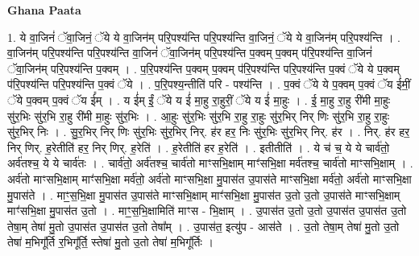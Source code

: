 \documentclass[17pt]{extarticle}
\begin{document}
\textbf{Ghana Paata } \newline

1. ये वा॒जिनं॑ ॅवा॒जिनं॒ ॅये ये वा॒जिन॑म् परि॒पश्य॑न्ति परि॒पश्य॑न्ति वा॒जिनं॒ ॅये ये वा॒जिन॑म् परि॒पश्य॑न्ति । . वा॒जिन॑म् परि॒पश्य॑न्ति परि॒पश्य॑न्ति वा॒जिनं॑ ॅवा॒जिन॑म् परि॒पश्य॑न्ति प॒क्वम् प॒क्वम् प॑रि॒पश्य॑न्ति वा॒जिनं॑ ॅवा॒जिन॑म् परि॒पश्य॑न्ति प॒क्वम् । . प॒रि॒पश्य॑न्ति प॒क्वम् प॒क्वम् प॑रि॒पश्य॑न्ति परि॒पश्य॑न्ति प॒क्वं ॅये ये प॒क्वम् प॑रि॒पश्य॑न्ति परि॒पश्य॑न्ति प॒क्वं ॅये । . प॒रि॒पश्य॒न्तीति॑ परि - पश्य॑न्ति । . प॒क्वं ॅये ये प॒क्वम् प॒क्वं ॅय ई॑मीं॒ ॅये प॒क्वम् प॒क्वं ॅय ई᳚म् । . य ई॑म् ईं॒ ॅये य ई॑ मा॒हु रा॒हुरीं॒ ॅये य ई॑ मा॒हुः । . ई॒ मा॒हु रा॒हु री॑मी मा॒हुः सु॑र॒भिः सु॑र॒भि रा॒हु री॑मी मा॒हुः सु॑र॒भिः । . आ॒हुः सु॑र॒भिः सु॑र॒भि रा॒हु रा॒हुः सु॑र॒भिर् निर् णिः सु॑र॒भि रा॒हु रा॒हुः सु॑र॒भिर् निः । . सु॒र॒भिर् निर् णिः सु॑र॒भिः सु॑र॒भिर् निर्. ह॑र हर॒ निः सु॑र॒भिः सु॑र॒भिर् निर्. ह॑र । . निर्. ह॑र हर॒ निर् णिर्. ह॒रेतीति॑ हर॒ निर् णिर्. ह॒रेति॑ । . ह॒रेतीति॑ हर ह॒रेति॑ । . इतीतीति॑ । . ये च॑ च॒ ये ये चार्व॑तो॒ अर्व॑तश्च॒ ये ये चार्व॑तः । . चार्व॑तो॒ अर्व॑तश्च॒ चार्व॑तो माꣳसभि॒क्षाम् माꣳ॑सभि॒क्षा मर्व॑तश्च॒ चार्व॑तो माꣳसभि॒क्षाम् । . अर्व॑तो माꣳसभि॒क्षाम् माꣳ॑सभि॒क्षा मर्व॑तो॒ अर्व॑तो माꣳसभि॒क्षा मु॒पास॑त उ॒पास॑ते माꣳसभि॒क्षा मर्व॑तो॒ अर्व॑तो माꣳसभि॒क्षा मु॒पास॑ते । . माꣳ॒॒स॒भि॒क्षा मु॒पास॑त उ॒पास॑ते माꣳसभि॒क्षाम् माꣳ॑सभि॒क्षा मु॒पास॑त उ॒तो उ॒तो उ॒पास॑ते माꣳसभि॒क्षाम् माꣳ॑सभि॒क्षा मु॒पास॑त उ॒तो । . माꣳ॒॒स॒भि॒क्षामिति॑ माꣳस - भि॒क्षाम् । . उ॒पास॑त उ॒तो उ॒तो उ॒पास॑त उ॒पास॑त उ॒तो तेषा॒म् तेषा॑ मु॒तो उ॒पास॑त उ॒पास॑त उ॒तो तेषा᳚म् । . उ॒पास॑त॒ इत्यु॑प - आस॑ते । . उ॒तो तेषा॒म् तेषा॑ मु॒तो उ॒तो तेषा॑ म॒भिगू᳚र्ति र॒भिगू᳚र्ति॒ स्तेषा॑ मु॒तो उ॒तो तेषा॑ म॒भिगू᳚र्तिः । \newline
\end{document}
